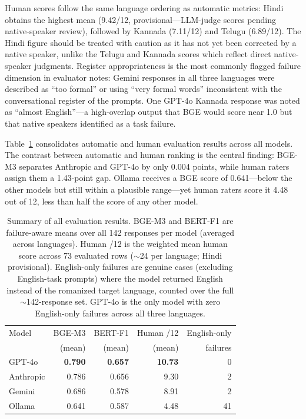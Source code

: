 \enspace
Human scores follow the same language ordering as automatic metrics: Hindi
obtains the highest mean (9.42/12, provisional---LLM-judge scores pending
native-speaker review), followed by Kannada (7.11/12) and Telugu (6.89/12).
The Hindi figure should be treated with caution as it has not yet been
corrected by a native speaker, unlike the Telugu and Kannada scores which
reflect direct native-speaker judgments. Register appropriateness is the most
commonly flagged failure dimension in evaluator notes: Gemini responses in all
three languages were described as ``too formal'' or using ``very formal words''
inconsistent with the conversational register of the prompts. One GPT-4o
Kannada response was noted as ``almost English''---a high-overlap output that
BGE would score near 1.0 but that native speakers identified as a task failure.

\enspace
Table~\ref{tab:summary} consolidates automatic and human evaluation results
across all models. The contrast between automatic and human ranking is the
central finding: BGE-M3 separates Anthropic and GPT-4o by only 0.004 points,
while human raters assign them a 1.43-point gap. Ollama receives a BGE score
of 0.641---below the other models but still within a plausible range---yet
human raters score it 4.48 out of 12, less than half the score of any other
model.

\begin{table}[t]
\centering
\small
\begin{tabular}{lrrrr}
\toprule
Model & BGE-M3 & BERT-F1 & Human /12 & English-only \\
      & (mean) & (mean)  & (mean)    & failures \\
\midrule
GPT-4o    & \textbf{0.790} & \textbf{0.657} & \textbf{10.73} & 0  \\
Anthropic & 0.786          & 0.656          & 9.30           & 2  \\
Gemini    & 0.686          & 0.578          & 8.91           & 2  \\
Ollama    & 0.641          & 0.587          & 4.48           & 41 \\
\bottomrule
\end{tabular}
\caption{Summary of all evaluation results. BGE-M3 and BERT-F1 are
failure-aware means over all 142 responses per model (averaged across
languages). Human /12 is the weighted mean human score across 73 evaluated
rows ($\sim$24 per language; Hindi provisional). English-only failures are
genuine cases (excluding English-task prompts) where the model returned
English instead of the romanized target language, counted over the full
$\sim$142-response set. GPT-4o is the only model with zero English-only
failures across all three languages.}
\label{tab:summary}
\end{table}
